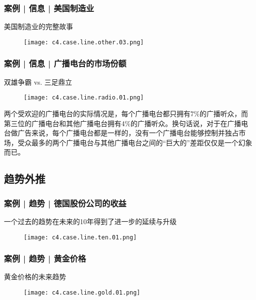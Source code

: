\begin{frame}
  \frametitle{案例 | 信息 | 美国制造业}
  \begin{block}{美国制造业的完整故事}
    \begin{figure}
      \centering
      \texttt{[image: c4.case.line.other.03.png]}
    \end{figure}
  \end{block}
\end{frame}

\begin{frame}
  \frametitle{案例 | 信息 | 广播电台的市场份额}
  \begin{block}{双雄争霸 vs. 三足鼎立}
    \begin{figure}
      \centering
      \texttt{[image: c4.case.line.radio.01.png]}
    \end{figure}
    \vspace{-1em}
    \pause
两个受欢迎的广播电台的实际情况是，每个广播电台都只拥有7\%的广播听众，而第三位的广播电台和其他广播电台拥有4\%的广播听众。换句话说，对于在广播电台做广告来说，每个广播电台都是一样的，没有一个广播电台能够控制并独占市场，受众最多的两个广播电台与其他广播电台之间的“巨大的”差距仅仅是一个幻象而已。
  \end{block}
\end{frame}

\subsection{趋势外推}
\begin{frame}
  \frametitle{案例 | 趋势 | 德国股份公司的收益}
  \begin{block}{一个过去的趋势在未来的10年得到了进一步的延续与升级}
    \begin{figure}
      \centering
      \texttt{[image: c4.case.line.ten.01.png]}
    \end{figure}
  \end{block}
\end{frame}

\begin{frame}
  \frametitle{案例 | 趋势 | 黄金价格}
  \begin{block}{黄金价格的未来趋势}
    \begin{figure}
      \centering
      \texttt{[image: c4.case.line.gold.01.png]}
    \end{figure}
  \end{block}
\end{frame}

